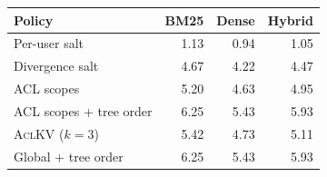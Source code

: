 \begin{tabular}{@{}l r r r@{}}
\toprule
Policy & BM25 & Dense & Hybrid \\
\midrule
Per-user salt & 1.13 & 0.94 & 1.05 \\
Divergence salt & 4.67 & 4.22 & 4.47 \\
ACL scopes & 5.20 & 4.63 & 4.95 \\
ACL scopes + tree order & 6.25 & 5.43 & 5.93 \\
\textsc{AclKV} ($k{=}3$) & 5.42 & 4.73 & 5.11 \\
Global + tree order & 6.25 & 5.43 & 5.93 \\
\bottomrule
\end{tabular}
